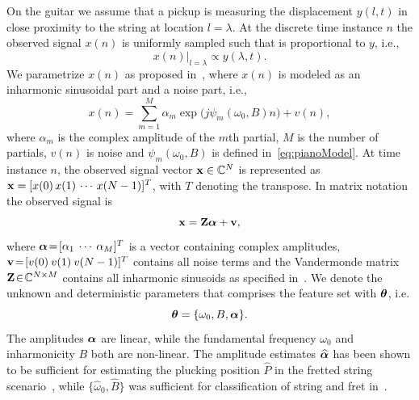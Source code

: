On the guitar we assume that a pickup is measuring the displacement $y(l,t)$ in close proximity to the string at location $l\!=\!\lambda$. At the discrete time instance $n$ the observed signal $x(n)$ is uniformly sampled such that is proportional to $y$, i.e.,
\begin{equation}
     x(n)  \vert_{l=\lambda} \propto y(\lambda, t).
\end{equation}   
We parametrize $x(n)$ as proposed in~\cite{hjerrild::icassp19}, where $x(n)$ is modeled as an inharmonic sinusoidal part and a noise part, i.e.,  
\begin{equation}\label{eq:sigmod1}
  x(n)\! =  \!\sum\limits_{m=1}^{M}\!\! \alpha_{m} \exp\big({j\psi_m(\omega_0,B) n}\big)+v(n),
\end{equation}
where $\alpha_{m}$ is the complex amplitude of the $m$th partial, $M$ is the number of partials, $v(n)$ is noise and $\psi_m(\omega_0,B)$ is defined in~\eqref{eq:pianoModel}.
%
 At time instance $n$, the observed signal vector $\mathbf x \in \mathbb{C}^N$ is represented as $\mathbf x = [x(0) \, x(1) \, \cdots \, x(N-1)]^T$, with $T$ denoting the transpose. %
In matrix notation the observed signal is%
\begin{equation}\label{eq:xZa}
  \mathbf x = \mathbf{Z} \text{\boldmath$\alpha$} + \mathbf v,
\end{equation} 
where $\text{\boldmath$\alpha$}\!=\! [\alpha_1 \: \cdots \: \alpha_M]^T$ is a vector containing complex amplitudes, $\mathbf v\! =\! [v(0) \: v(1) \: v(N-1)]^T$ contains all noise terms and the Vandermonde matrix $\mathbf{Z}\! \in\! \mathbb{C}^{N\times M}$ contains all inharmonic sinusoids as specified in~\cite{hjerrild::icassp19}.
We denote the unknown and deterministic parameters that comprises the feature set with $\text{\boldmath$\theta$}$, i.e.
\begin{equation}\label{eq:theta_parameters}
  \text{\boldmath$\theta$} = \{\omega_0, B, \text{\boldmath$\alpha$}\}.
\end{equation}
The amplitudes $\text{\boldmath$\alpha$}$ are linear, while the fundamental frequency $\omega_0$ and inharmonicity $B$ both are non-linear. 
The amplitude estimates $\text{\boldmath${\widehat\alpha}$}$ has been shown to be sufficient for estimating the plucking position $\widehat{P}$ in the fretted string scenario~\cite{hjerrild::icassp19}, while $\{\widehat\omega_0, \widehat B \} $ was sufficient for classification of string and fret in~\cite{barbancho:inharmonicity_tablature,michelson2018_aes}.
